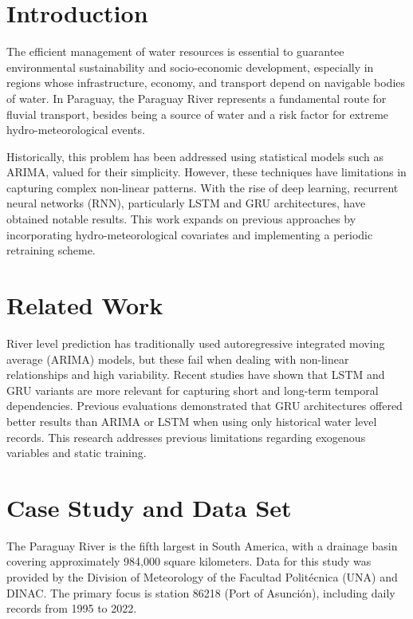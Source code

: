 \documentclass[11pt, a4paper, oneside]{Thesis} %
\begin{document}
    \mainmatter
    \pagestyle{fancy}

    \section{Introduction}
    The efficient management of water resources is essential to guarantee environmental sustainability and socio-economic development, especially in regions whose infrastructure, economy, and transport depend on navigable bodies of water. In Paraguay, the Paraguay River represents a fundamental route for fluvial transport, besides being a source of water and a risk factor for extreme hydro-meteorological events.
    
    Historically, this problem has been addressed using statistical models such as ARIMA, valued for their simplicity. However, these techniques have limitations in capturing complex non-linear patterns. With the rise of deep learning, recurrent neural networks (RNN), particularly LSTM and GRU architectures, have obtained notable results. This work expands on previous approaches by incorporating hydro-meteorological covariates and implementing a periodic retraining scheme.

    \section{Related Work}
    River level prediction has traditionally used autoregressive integrated moving average (ARIMA) models, but these fail when dealing with non-linear relationships and high variability. Recent studies have shown that LSTM and GRU variants are more relevant for capturing short and long-term temporal dependencies. Previous evaluations demonstrated that GRU architectures offered better results than ARIMA or LSTM when using only historical water level records. This research addresses previous limitations regarding exogenous variables and static training.

    \section{Case Study and Data Set}
    The Paraguay River is the fifth largest in South America, with a drainage basin covering approximately 984,000 square kilometers. Data for this study was provided by the Division of Meteorology of the Facultad Politécnica (UNA) and DINAC. The primary focus is station 86218 (Port of Asunción), including daily records from 1995 to 2022.
\end{document}
